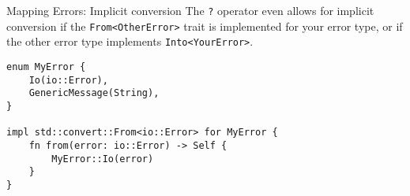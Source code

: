 
\begin{frame}[fragile]{Mapping Errors: Implicit conversion}
The \texttt{?} operator even allows for implicit conversion if the
\texttt{From<OtherError>} trait is implemented for your error type, or if the
other error type implements \texttt{Into<YourError>}.

\begin{verbatim}
enum MyError {
    Io(io::Error),
    GenericMessage(String),
}

impl std::convert::From<io::Error> for MyError {
    fn from(error: io::Error) -> Self {
        MyError::Io(error)
    }
}
\end{verbatim}
\end{frame}
